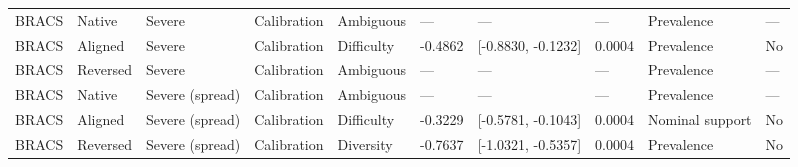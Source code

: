 \begin{longtable}{llllllllll}
BRACS & Native & Severe & Calibration & Ambiguous & --- & --- & --- & Prevalence & --- \\
BRACS & Aligned & Severe & Calibration & Difficulty & -0.4862 & [-0.8830, -0.1232] & 0.0004 & Prevalence & No \\
BRACS & Reversed & Severe & Calibration & Ambiguous & --- & --- & --- & Prevalence & --- \\
BRACS & Native & Severe (spread) & Calibration & Ambiguous & --- & --- & --- & Prevalence & --- \\
BRACS & Aligned & Severe (spread) & Calibration & Difficulty & -0.3229 & [-0.5781, -0.1043] & 0.0004 & Nominal support & No \\
BRACS & Reversed & Severe (spread) & Calibration & Diversity & -0.7637 & [-1.0321, -0.5357] & 0.0004 & Prevalence & No \\
\end{longtable}
